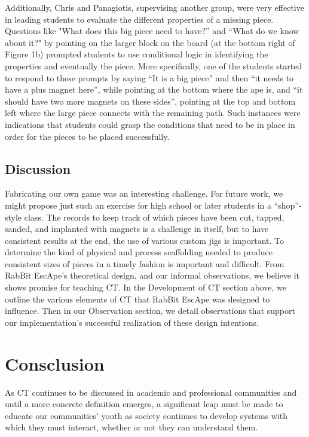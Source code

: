 \documentclass{acm_proc_article-sp}
\begin{document}
Additionally, Chris and Panagiotis, supervising another group, were very effective in leading students to evaluate the different properties of a missing piece. Questions like "What does this big piece need to have?” and “What do we know about it?" by pointing on the larger block on the board (at the bottom right of Figure 1b) prompted students to use conditional logic in identifying the properties and eventually the piece. More specifically, one of the students started to respond to these prompts by saying “It is a big piece” and then “it needs to have a plus magnet here”, while pointing at the bottom where the ape is, and “it should have two more magnets on these sides”, pointing at the top and bottom left where the large piece connects with the remaining path. Such instances were indications that students could grasp the conditions that need to be in place in order for the pieces to be placed successfully.

\subsection{Discussion}
Fabricating our own game was an interesting challenge. For future work, we might propose just such an exercise for high school or later students in a “shop”-style class. The records to keep track of which pieces have been cut, tapped, sanded, and implanted with magnets is a challenge in itself, but to have consistent results at the end, the use of various custom jigs is important. To determine the kind of physical and process scaffolding needed to produce consistent sizes of pieces in a timely fashion is important and difficult. 
From RabBit EscApe’s theoretical design, and our informal observations, we believe it shows promise for teaching CT. In the Development of CT section above, we outline the various elements of CT that RabBit EscApe was designed to influence. Then in our Observation section, we detail observations that support our implementation’s successful realization of these design intentions. 

\section{Consclusion}
As CT continues to be discussed in academic and professional communities and until a more concrete definition emerges, a significant leap must be made to educate our communities’ youth as society continues to develop systems with which they must interact, whether or not they can understand them. 
\end{document}
